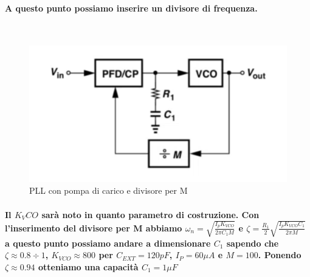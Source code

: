 \documentclass{article}
\begin{document}
\paragraph{A questo punto possiamo inserire un divisore di frequenza.}
~\begin{figure}[!h]%
\includegraphics[scale=0.6]{DivM.png} 
\caption{PLL con pompa di carico e divisore per M}
\label{fig:foo}
\end{figure}
\paragraph{Il $K_VCO$ sarà noto in quanto parametro di costruzione.
Con l'inserimento del divisore per M abbiamo $\omega _n=\sqrt{\frac{I_p K_{VCO}}{2 \pi C_1M} }$ e $\zeta=\frac{R_1}{2}\sqrt{\frac{I_p K_{VCO}C_1}{2\pi M}}$ a questo punto possiamo andare a dimensionare $C_1$ sapendo che\\ $\zeta \approx0.8 \div 1$, $K_{VCO}\approx800$ per $C_{EXT}=120pF$, $I_P=60\mu A$ e $M=100$.
Ponendo $\zeta \approx0.94$ otteniamo una capacità $C_1=1\mu F$  }
 
\end{document}
